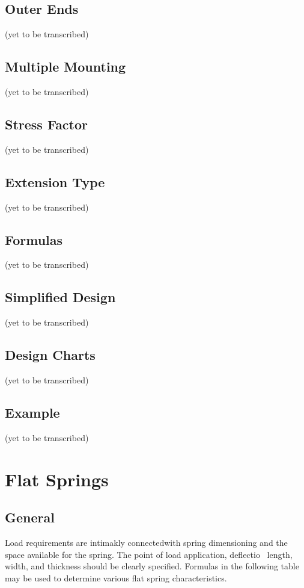 \documentclass[10pt]{article}
\begin{document}
\subsection{Outer Ends} %
(yet to be transcribed)



\subsection{Multiple Mounting} %
(yet to be transcribed)

\subsection{Stress Factor}
(yet to be transcribed)

\subsection{Extension Type} %
(yet to be transcribed)

\subsection{Formulas}
(yet to be transcribed)

\subsection{Simplified Design} %
(yet to be transcribed)

\subsection{Design Charts}
(yet to be transcribed)

\subsection{Example} %
(yet to be transcribed)




\clearpage
\section{Flat Springs} %
\subsection{General} %
Load requirements are intimakly
connectedwith spring dimensioning
and the space available for the spring. 
The
point of load application, deflectio~ length, width, and thickness should be clearly specified.
Formulas in the following table may be
used to determine various flat spring characteristics.
\end{document}
